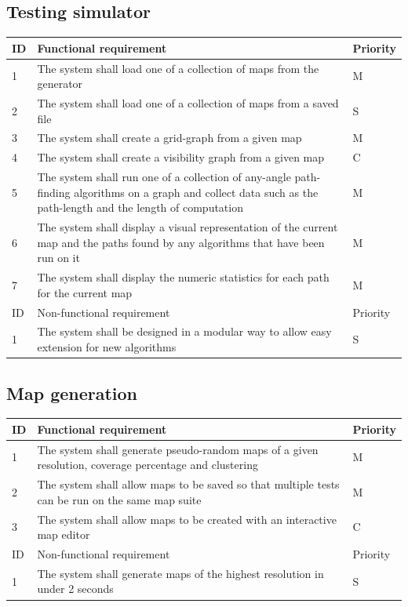 \documentclass[12pt,notitlepage]{report}
\begin{document}
\subsection{Testing simulator}

\begin{center}
    \begin{tabular}{ l | p{10cm} | l}
    ID & Functional requirement & Priority  \\ \hline
    1 & The system shall load one of a collection of maps from the generator & M \\ \hline
    2 & The system shall load one of a collection of maps from a saved file & S \\ \hline
    3 & The system shall create a grid-graph from a given map & M \\ \hline
    4 & The system shall create a visibility graph from a given map & C \\ \hline
    5 & The system shall run one of a collection of any-angle path-finding algorithms on a graph and collect data such as the path-length and the length of computation & M \\ \hline
    6 & The system shall display a visual representation of the current map and the paths found by any algorithms that have been run on it & M \\ \hline
    7 & The system shall display the numeric statistics for each path for the current map & M \\ \hline
     \hline 
    ID & Non-functional requirement & Priority  \\ \hline
    1 & The system shall be designed in a modular way to allow easy extension for new algorithms & S \\
    \end{tabular}
\end{center}

\subsection{Map generation}

\begin{center}
    \begin{tabular}{ l | p{10cm} | l }
    ID & Functional requirement & Priority  \\ \hline
    1 & The system shall generate pseudo-random maps of a given resolution, coverage percentage and clustering & M \\ \hline
    2 & The system shall allow maps to be saved so that multiple tests can be run on the same map suite & M \\ \hline
     3 & The system shall allow maps to be created with an interactive map editor & C\\ \hline
          \hline 
    ID & Non-functional requirement & Priority  \\ \hline
    1 & The system shall generate maps of the highest resolution in under 2 seconds & S \\
    \end{tabular}
\end{center}
	
\end{document}
